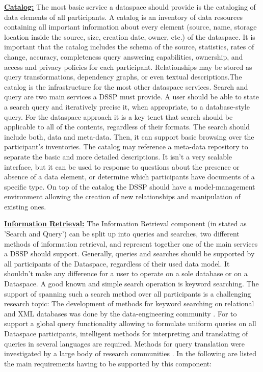 \uline{\textbf{Catalog:}} 
The most basic service a dataspace should provide is the cataloging of data elements of all participants. A catalog is an inventory of data resources containing all important information about every element (source, name, storage location inside the source, size, creation date, owner, etc.) of the dataspace. 
It is important that the catalog includes the schema of the source, statistics, rates of change, accuracy, completeness query answering capabilities, ownership, and access and privacy policies for each participant. 
Relationships may be stored as query transformations, dependency graphs, or even textual descriptions.The catalog is the infrastructure for the most other dataspace services. Search and query are two main services a DSSP must provide. A user should be able to state a search query and iteratively precise it, when appropriate, to a database-style query. For the dataspace approach it is a key tenet that search should be applicable to all of the contents, regardless of their formats.
The search should include both, data and meta-data. Then, it can support basic browsing over the participant's inventories. The catalog may reference a meta-data repository to separate the basic and more detailed descriptions.
It isn't a very scalable interface, but it can be used to response to questions about the presence or absence of a data element, or determine which participants have documents of a specific type. 
On top of the catalog the DSSP should have a model-management environment allowing the creation of new relationships and manipulation of existing ones.

\uline{\textbf{Information Retrieval:}} The Information Retrieval component (in \cite{Halevy:2006:PDS:1142351.1142352} stated as 'Search and Query') can be split up into queries and searches, two different methods of information retrieval, and represent together one of the main services a DSSP should support. 
Generally, queries and searches should be supported by all participants of the Dataspace, regardless of their used data model. 
It shouldn't make any difference for a user to operate on a sole database or on a Dataspace. 
A good known and simple search operation is keyword searching. 
The support of spanning such a search method over all participants is a challenging research topic: The development of methods for keyword searching on relational and XML databases was done by the data-engineering community \cite{994693, Guo:2003:XRK:872757.872762, Hristidis:2002:DKS:1287369.1287427}. 
For to support a global query functionality allowing to formulate uniform queries on all Dataspace participants, intelligent methods for interpreting and translating of queries in several languages are required. Methods for query translation were investigated by a large body of research communities \cite{Carey00xperanto:publishing, 1319983}.
In the following are listed the main requirements having to be supported by this component:


